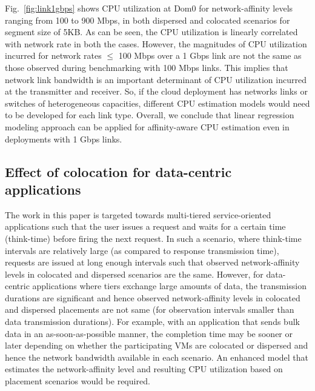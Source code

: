 Fig.~\ref{fig:link1gbps} shows CPU utilization at Dom0
for network-affinity levels ranging from 100 to 900 Mbps, in 
both dispersed and colocated scenarios for segment size of
5KB. As can be seen, the CPU utilization is linearly correlated with
network rate in both the cases. 
However, the magnitudes of CPU utilization
incurred for network rates $\le$ 100 Mbps over a 1 Gbps link are not the 
same as those observed during benchmarking with 100 Mbps links. 
This implies that network link bandwidth is an important
determinant of CPU utilization incurred at the transmitter and
receiver. So, if the cloud deployment has networks links or switches 
of heterogeneous capacities,
different CPU estimation models would need to be
developed for each link type.
Overall, we conclude that 
linear regression modeling approach can be applied for affinity-aware
CPU estimation even in deployments with 1 Gbps links. 

\subsection{Effect of colocation for data-centric applications}
The work in this paper is targeted towards multi-tiered service-oriented
applications such that the user issues a request and waits 
for a certain time (think-time) before firing the next request.
In such a scenario, where think-time intervals are relatively large
(as compared to response transmission time),
requests are issued at long enough intervals
such that observed network-affinity levels
in colocated and dispersed scenarios are the same. 
However, for data-centric applications 
where tiers exchange large amounts of data, the transmission
durations are significant and hence 
observed network-affinity levels in colocated
and dispersed placements are not same (for observation intervals
smaller than data transmission durations).
For example, with an application
that sends bulk data in an as-soon-as-possible manner, the 
completion time may be sooner or later depending
on whether the participating VMs are colocated or dispersed
and hence the network bandwidth available in each scenario. 
An enhanced model that estimates the network-affinity level 
and resulting CPU utilization based on placement scenarios would
be required.

